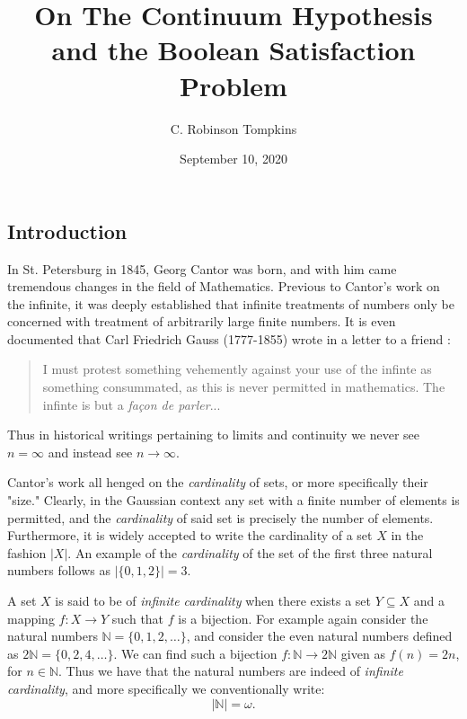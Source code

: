 \documentclass[12pt]{amsart}
\title{On The Continuum Hypothesis and the Boolean Satisfaction Problem}
\author{C. Robinson Tompkins}
\date{September 10, 2020}
\theoremstyle{definition}
\theoremstyle{plain}
\theoremstyle{nameit}
\theoremstyle{plain}
\begin{document}
\maketitle
\begin{onehalfspace}

\section{Introduction}
In St. Petersburg in 1845, Georg Cantor was born, and with him came tremendous changes in the field
of Mathematics. Previous to Cantor's work on the infinite, it was deeply established that infinite
treatments of numbers only be concerned with treatment of arbitrarily large finite numbers. It is
even documented that Carl Friedrich Gauss (1777-1855) wrote in a letter to a friend \cite{maor}:

\begin{quotation}
I must protest something vehemently against your use of the infinte as something consummated, as
this is never permitted in mathematics. The infinte is but a \emph{fa\c{c}on de parler}...
\end{quotation}

Thus in historical writings pertaining to limits and continuity we never see $n = \infty$ and instead see
$n\to\infty$.

Cantor's work all henged on the \emph{cardinality} of sets, or more specifically their "size." Clearly, in
the Gaussian context any set with a finite number of elements is permitted, and the \emph{cardinality} of said
set is precisely the number of elements. Furthermore, it is widely accepted to write the cardinality of a set $X$
in the fashion $\vert X\vert$. An example of the \emph{cardinality} of the set of the first three natural numbers
follows as $\vert\{0, 1, 2 \}\vert = 3$.

A set $X$ is said to be of \emph{infinite cardinality} when there exists a set $Y \subseteq X$ and a mapping
$f : X \to Y$ such that $f$ is a bijection. For example again consider the natural numbers
$\mathbb{N} = \{0, 1, 2, \ldots \}$, and consider the even natural numbers defined as
$2\mathbb{N} = \{0, 2, 4, \ldots\}$. We can find such a bijection $f: \mathbb{N}\to 2\mathbb{N}$ given
as $f(n) = 2n$, for $n\in\mathbb{N}$. Thus we have that the natural numbers are indeed of \emph{infinite cardinality},
and more specifically we conventionally write:
\begin{equation}
\vert\mathbb{N}\vert=\omega.
\label{eq:cardNat}
\end{equation}


\end{onehalfspace}
\end{document}
